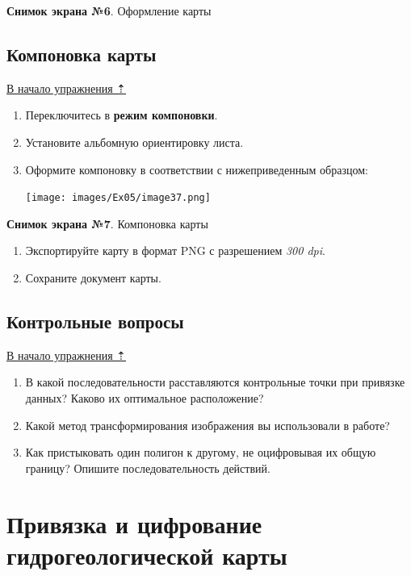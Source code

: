 \documentclass[12pt,]{book}
\begin{document}
\textbf{Снимок экрана №6}. Оформление карты

\hypertarget{map-ref-general-layout}{%
\section{Компоновка карты}\label{map-ref-general-layout}}

\protect\hyperlink{map-ref-general}{В начало упражнения ⇡}

\begin{enumerate}
\def\labelenumi{\arabic{enumi}.}
\item
  Переключитесь в \textbf{режим компоновки}.
\item
  Установите альбомную ориентировку листа.
\item
  Оформите компоновку в соответствии с нижеприведенным образцом:

  \texttt{[image: images/Ex05/image37.png]}
\end{enumerate}

\textbf{Снимок экрана №7}. Компоновка карты

\begin{enumerate}
\def\labelenumi{\arabic{enumi}.}
\item
  Экспортируйте карту в формат PNG с разрешением \emph{300 dpi}.
\item
  Сохраните документ карты.
\end{enumerate}

\hypertarget{map-ref-general-questions}{%
\section{Контрольные вопросы}\label{map-ref-general-questions}}

\protect\hyperlink{map-ref-general}{В начало упражнения ⇡}

\begin{enumerate}
\def\labelenumi{\arabic{enumi}.}
\item
  В какой последовательности расставляются контрольные точки при привязке данных? Каково их оптимальное расположение?
\item
  Какой метод трансформирования изображения вы использовали в работе?
\item
  Как пристыковать один полигон к другому, не оцифровывая их общую границу? Опишите последовательность действий.
\end{enumerate}

\hypertarget{map-ref-hydrogeologic}{%
\chapter{Привязка и цифрование гидрогеологической карты}\label{map-ref-hydrogeologic}}
\end{document}

